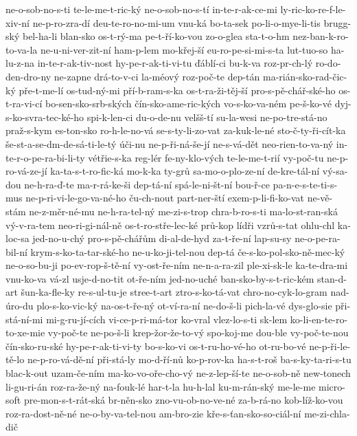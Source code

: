 ne-o-sob-no-s-ti
te-le-me-t-ric-ký
ne-o-sob-no-s-tí
in-te-r-ak-ce-mi
ly-ric-ko-re-f-le-xiv-ní
ne-p-ro-zra-dí
deu-te-ro-no-mi-um
vnu-ká
bo-ta-sek
po-li-o-mye-li-tis
brugg-ský
bel-ha-li
blan-sko
os-t-rý-ma
pe-t-ří-ko-vou
zo-o-glea
sta-t-o-hm
nez-ban-k-ro-to-va-la
ne-u-ni-ver-zit-ní
ham-p-lem
mo-křej-ší
eu-ro-pe-si-mi-s-ta
lut-tuo-so
ha-lu-z-na
in-te-r-ak-tiv-nost
hy-pe-r-ak-ti-vi-tu
ďáblí-ci
bu-k-va
roz-pr-ch-lý
ro-do-den-dro-ny
ne-zapne
drá-to-v-ci
la-méový
roz-poč-te
dep-tán
ma-rián-sko-rad-čic-ký
pře-t-me-lí
os-tud-ný-mi
pří-b-ram-s-ka
os-t-ra-ži-těj-ší
pro-s-pě-chář-ské-ho
os-t-ra-vi-cí
bo-sen-sko-srb-ských
čín-sko-ame-ric-kých
vo-s-ko-va-ném
pe-š-ko-vé
dyj-s-ko-svra-tec-ké-ho
spi-k-len-ci
du-o-de-nu
velšš-tí
su-la-wesi
ne-po-tre-stá-no
praž-s-kym
es-ton-sko
ro-h-le-no-vá
se-s-ty-li-zo-vat
za-kuk-le-né
sto-č-ty-ři-cít-ka
še-st-a-se-dm-de-sá-ti-le-tý
úči-nu
ne-p-ři-ná-še-jí
ne-s-vá-dět
neo-rien-to-va-ný
in-te-r-o-pe-ra-bi-li-ty
vétřie-s-ka
reg-lér
fe-ny-klo-vých
te-le-me-t-rií
vy-poč-tu
ne-p-ro-vá-ze-jí
ka-ta-s-t-ro-fic-ká
mo-k-ka
ty-grů
sa-mo-o-plo-ze-ní
de-kre-tál-ní
vý-sa-dou
ne-h-ra-ď-te
ma-r-rá-ke-ši
dep-tá-ní
spá-le-ni-št-ní
bou-ř-ce
pa-n-e-s-te-ti-s-mus
ne-p-ri-vi-le-go-va-né-ho
ču-ch-nout
part-ner-ští
exem-p-li-fi-ko-vat
ne-vě-stám
ne-z-měr-né-mu
ne-h-ra-tel-ný
me-zi-s-trop
chra-b-ro-s-ti
ma-lo-st-ran-ská
vý-v-ra-tem
neo-ri-gi-nál-ně
os-t-ro-stře-lec-ké
prů-kop
lídři
vzrů-s-tat
ohlu-chl
ka-loc-sa
jed-no-u-chý
pro-s-pě-chářům
di-al-de-hyd
za-t-ře-ní
lap-su-sy
ne-o-pe-ra-bil-ní
krym-s-ko-ta-tar-ské-ho
ne-u-ko-ji-tel-nou
dep-tá
če-s-ko-pol-sko-ně-mec-ký
ne-o-so-bu-ji
po-ev-rop-š-tě-ní
vy-ost-ře-ním
ne-n-a-ra-zil
ple-xi-sk-le
ka-te-dra-mi
vnu-ko-va
vá-zl
usje-d-no-tit
ot-ře-ním
jed-no-uché
ban-sko-by-s-t-ric-kém
stan-d-art
šun-ka-fle-ky
re-s-ul-tu-je
stree-t-art
ztro-s-ko-tá-vat
chro-no-cyk-lo-gram
nad-úro-du
plo-s-ko-vic-ký
na-os-t-ře-ný
ot-ví-ra-ní
ne-do-š-li
pich-la-vé
dys-glo-sie
při-stá-ní-mi
mi-g-ru-jí-cích
vi-ce-p-ri-má-tor
ko-vral
vlez-lo-s-ti
sk-lem
ko-li-en-te-ro-to-xe-mie
vy-poč-te
ne-po-š-li
krep-žor-že-to-vý
spo-koj-me
dou-ble
vy-poč-te-nou
čín-sko-ru-ské
hy-pe-r-ak-ti-vi-ty
bo-s-ko-vi
os-t-ru-ho-vé-ho
ot-ru-bo-vé
ne-p-ři-le-tě-lo
ne-p-ro-vá-dě-ní
při-stá-ly
mo-d-ří-nů
ko-p-rov-ka
ha-s-t-roš
ba-s-ky-ta-ri-s-tu
blac-k-out
uzam-če-ním
ma-ko-vo-oře-cho-vý
ne-z-lep-ší-te
ne-o-sob-ně
new-tonech
li-gu-ri-án
roz-ra-že-ný
na-fouk-lé
har-t-la
hu-h-lal
ku-m-rán-ský
me-le-me
micro-soft
pre-mon-s-t-rát-ská
br-něn-sko
zno-vu-ob-no-ve-né
za-b-rá-no
kob-líž-ko-vou
roz-ra-dost-ně-né
ne-o-by-va-tel-nou
am-bro-zie
kře-s-ťan-sko-so-ciál-ní
me-zi-chla-dič
